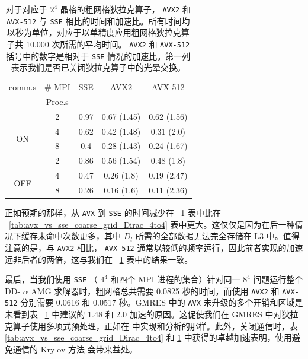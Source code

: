 \documentclass[5p,times,a4paper,fleqn]{cas-dc}
\begin{document}
   \begin{table}
    \centering
    \caption{对于对应于    $2^4$    晶格的粗网格狄拉克算子，   \texttt{AVX2}    和    \texttt{AVX-512}    与    \texttt{SSE}    相比的时间和加速比。所有时间均以秒为单位，对应于以单精度应用粗网格狄拉克算子共 10,000 次所需的平均时间。   \texttt{AVX2}    和    \texttt{AVX-512}    括号中的数字是相对于    \texttt{SSE}    情况的加速比。第一列表示我们是否已关闭狄拉克算子中的光晕交换。  }
    \label{tab:avx_vs_sse_coarse_grid_Dirac_2to4}
    \begin{tabular}{ccccc}
    \hline
    comm.s                 &  \#  MPI   & SSE   & AVX2        & AVX-512      \\ 
                           & Proc.s   &       &             &              \\  \hline
                           & 2        & 0.97  & 0.67 (1.45) & 0.62 (1.56)  \\ 
    \multirow{2}{*}{ON}    & 4        & 0.62  & 0.42 (1.48) & 0.31 (2.0)   \\ 
                           & 8        & 0.4   & 0.28 (1.43) & 0.24 (1.67)  \\  \hline
                           & 2        & 0.86  & 0.56 (1.54) & 0.48 (1.8)   \\ 
    \multirow{2}{*}{OFF}   & 4        & 0.47  & 0.26 (1.8)  & 0.19 (2.47)  \\ 
                           & 8        & 0.26  & 0.16 (1.6)  & 0.11 (2.36)  \\  \hline
    \end{tabular}
\end{table}     

正如预期的那样，从    \texttt{AVX}    到    \texttt{SSE}    的时间减少在 \     \ref{tab:avx_vs_sse_coarse_grid_Dirac_2to4}    表中比在 \     \ref{tab:avx_vs_sse_coarse_grid_Dirac_4to4}    表中更大。这仅仅是因为在后一种情况下缓存未命中次数更多，其中    $D_{l}$    所需的全部数据无法完全存储在 L3 中。值得注意的是，与    \texttt{AVX2}    相比，   \texttt{AVX-512}    通常以较低的频率运行，因此前者实现的加速远非后者的两倍，这与我们在 \     \ref{tab:avx_vs_sse_coarse_grid_Dirac_2to4}    表中的结果一致。  

最后，当我们使用    \texttt{SSE}   （   $4^4$    和四个 MPI 进程的集合）针对同一    $8^4$    问题运行整个 DD-    $\alpha$    AMG 求解器时，粗网格总共需要 0.0825 秒的时间，而使用    \texttt{AVX2}    和    \texttt{AVX-512}    分别需要 0.0616 和 0.0517 秒。GMRES 中的    \texttt{AVX}    未升级的多个开销和区域是未看到表 \     \ref{tab:avx_vs_sse_coarse_grid_Dirac_2to4}    中建议的 1.48 和 2.0 加速的原因。这促使我们在 GMRES    \cite{loe2022toward}    中对狄拉克算子使用多项式预处理，正如在    \cite{espinoza2023coarsest}    中实现和分析的那样。此外，关闭通信时，表    \ref{tab:avx_vs_sse_coarse_grid_Dirac_4to4}    和    \ref{tab:avx_vs_sse_coarse_grid_Dirac_2to4}    中获得的卓越加速表明，使用避免通信的 Krylov 方法    \cite{hoemmen2010communication}    会带来益处。  
\end{document}
